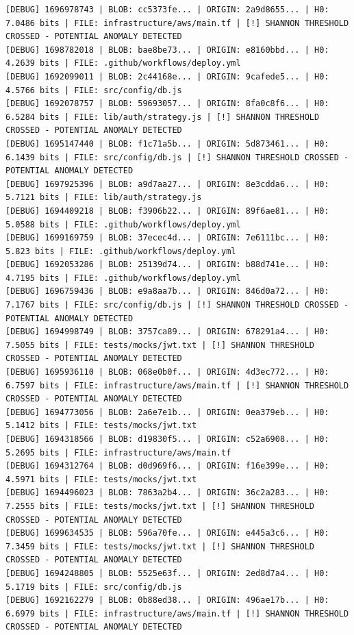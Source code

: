 \documentclass[12pt, a4paper, oneside]{report}
\begin{document}
\begin{lstlisting}[basicstyle=\tiny\ttfamily]
[DEBUG] 1696978743 | BLOB: cc5373fe... | ORIGIN: 2a9d8655... | H0: 7.0486 bits | FILE: infrastructure/aws/main.tf | [!] SHANNON THRESHOLD CROSSED - POTENTIAL ANOMALY DETECTED
[DEBUG] 1698782018 | BLOB: bae8be73... | ORIGIN: e8160bbd... | H0: 4.2639 bits | FILE: .github/workflows/deploy.yml
[DEBUG] 1692099011 | BLOB: 2c44168e... | ORIGIN: 9cafede5... | H0: 4.5766 bits | FILE: src/config/db.js
[DEBUG] 1692078757 | BLOB: 59693057... | ORIGIN: 8fa0c8f6... | H0: 6.5284 bits | FILE: lib/auth/strategy.js | [!] SHANNON THRESHOLD CROSSED - POTENTIAL ANOMALY DETECTED
[DEBUG] 1695147440 | BLOB: f1c71a5b... | ORIGIN: 5d873461... | H0: 6.1439 bits | FILE: src/config/db.js | [!] SHANNON THRESHOLD CROSSED - POTENTIAL ANOMALY DETECTED
[DEBUG] 1697925396 | BLOB: a9d7aa27... | ORIGIN: 8e3cdda6... | H0: 5.7121 bits | FILE: lib/auth/strategy.js
[DEBUG] 1694409218 | BLOB: f3906b22... | ORIGIN: 89f6ae81... | H0: 5.0588 bits | FILE: .github/workflows/deploy.yml
[DEBUG] 1699169759 | BLOB: 37ecec4d... | ORIGIN: 7e6111bc... | H0: 5.823 bits | FILE: .github/workflows/deploy.yml
[DEBUG] 1692053286 | BLOB: 25139d74... | ORIGIN: b88d741e... | H0: 4.7195 bits | FILE: .github/workflows/deploy.yml
[DEBUG] 1696759436 | BLOB: e9a8aa7b... | ORIGIN: 846d0a72... | H0: 7.1767 bits | FILE: src/config/db.js | [!] SHANNON THRESHOLD CROSSED - POTENTIAL ANOMALY DETECTED
[DEBUG] 1694998749 | BLOB: 3757ca89... | ORIGIN: 678291a4... | H0: 7.5055 bits | FILE: tests/mocks/jwt.txt | [!] SHANNON THRESHOLD CROSSED - POTENTIAL ANOMALY DETECTED
[DEBUG] 1695936110 | BLOB: 068e0b0f... | ORIGIN: 4d3ec772... | H0: 6.7597 bits | FILE: infrastructure/aws/main.tf | [!] SHANNON THRESHOLD CROSSED - POTENTIAL ANOMALY DETECTED
[DEBUG] 1694773056 | BLOB: 2a6e7e1b... | ORIGIN: 0ea379eb... | H0: 5.1412 bits | FILE: tests/mocks/jwt.txt
[DEBUG] 1694318566 | BLOB: d19830f5... | ORIGIN: c52a6908... | H0: 5.2695 bits | FILE: infrastructure/aws/main.tf
[DEBUG] 1694312764 | BLOB: d0d969f6... | ORIGIN: f16e399e... | H0: 4.5971 bits | FILE: tests/mocks/jwt.txt
[DEBUG] 1694496023 | BLOB: 7863a2b4... | ORIGIN: 36c2a283... | H0: 7.2555 bits | FILE: tests/mocks/jwt.txt | [!] SHANNON THRESHOLD CROSSED - POTENTIAL ANOMALY DETECTED
[DEBUG] 1699634535 | BLOB: 596a70fe... | ORIGIN: e445a3c6... | H0: 7.3459 bits | FILE: tests/mocks/jwt.txt | [!] SHANNON THRESHOLD CROSSED - POTENTIAL ANOMALY DETECTED
[DEBUG] 1694248805 | BLOB: 5525e63f... | ORIGIN: 2ed8d7a4... | H0: 5.1719 bits | FILE: src/config/db.js
[DEBUG] 1692162279 | BLOB: 0b88ed38... | ORIGIN: 496ae17b... | H0: 6.6979 bits | FILE: infrastructure/aws/main.tf | [!] SHANNON THRESHOLD CROSSED - POTENTIAL ANOMALY DETECTED

\end{lstlisting}
\end{document}
